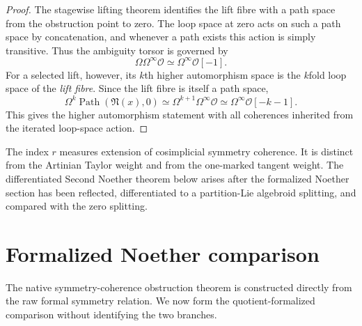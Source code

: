 \begin{proof}
The stagewise lifting theorem identifies the lift fibre with a path space from the
obstruction point to zero.  The loop space at zero acts on such a path space by
concatenation, and whenever a path exists this action is simply transitive.  Thus the
ambiguity torsor is governed by
\[
\Omega\Omega^\infty\mathcal O
\simeq
\Omega^\infty\mathcal O[-1].
\]
For a selected lift, however, its $k$th higher automorphism space is the $k$fold loop
space of the \emph{lift fibre}.  Since the lift fibre is itself a path space,
\[
\Omega^k\operatorname{Path}(\mathfrak N(x),0)
\simeq
\Omega^{k+1}\Omega^\infty\mathcal O
\simeq
\Omega^\infty\mathcal O[-k-1].
\]
This gives the higher automorphism statement with all coherences inherited from the
iterated loop-space action.
\end{proof}



\begin{remark}
\label{rem:symmetry-noether-this-is-not-yet-the-differentiated-second-noether-theorem}
The index $r$ measures extension of cosimplicial symmetry coherence.  It is distinct
from the Artinian Taylor weight and from the one-marked tangent weight.  The
differentiated Second Noether theorem below arises after the formalized Noether
section has been reflected, differentiated to a partition-Lie algebroid splitting,
and compared with the zero splitting.
\end{remark}

\section{Formalized Noether comparison}
\label{sec:symmetry-noether-formalized-noether-comparison}

The native symmetry-coherence obstruction theorem is constructed directly from the raw formal
symmetry relation.  We now form the quotient-formalized comparison without
identifying the two branches.

